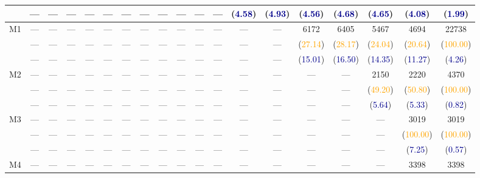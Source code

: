 {\begin{tabular}{cccccccccc|ccccccccc}
            &---&---&---&---&---&---&---&---&---&---&---&(\textcolor{darkblue}{4.58})&(\textcolor{darkblue}{4.93})&(\textcolor{darkblue}{4.56})&(\textcolor{darkblue}{4.68})&(\textcolor{darkblue}{4.65})&(\textcolor{darkblue}{4.08})&(\textcolor{darkblue}{1.99})\\\midrule
\multirow{3}{*}{M1}&          ---&          ---&          ---&          ---&          ---&          ---&          ---&          ---&          ---&          ---&          ---&          ---&          ---&        6172&        6405&        5467&        4694&       22738\\
            &---&---&---&---&---&---&---&---&---&---&---&---&---&(\textcolor{orange}{27.14})&(\textcolor{orange}{28.17})&(\textcolor{orange}{24.04})&(\textcolor{orange}{20.64})&(\textcolor{orange}{100.00})\\
            &---&---&---&---&---&---&---&---&---&---&---&---&---&(\textcolor{darkblue}{15.01})&(\textcolor{darkblue}{16.50})&(\textcolor{darkblue}{14.35})&(\textcolor{darkblue}{11.27})&(\textcolor{darkblue}{4.26})\\\midrule
\multirow{3}{*}{M2}&          ---&          ---&          ---&          ---&          ---&          ---&          ---&          ---&          ---&          ---&          ---&          ---&          ---&          ---&          ---&        2150&        2220&        4370\\
            &---&---&---&---&---&---&---&---&---&---&---&---&---&---&---&(\textcolor{orange}{49.20})&(\textcolor{orange}{50.80})&(\textcolor{orange}{100.00})\\
            &---&---&---&---&---&---&---&---&---&---&---&---&---&---&---&(\textcolor{darkblue}{5.64})&(\textcolor{darkblue}{5.33})&(\textcolor{darkblue}{0.82})\\\midrule
\multirow{3}{*}{M3}&          ---&          ---&          ---&          ---&          ---&          ---&          ---&          ---&          ---&          ---&          ---&          ---&          ---&          ---&          ---&          ---&        3019&        3019\\
            &---&---&---&---&---&---&---&---&---&---&---&---&---&---&---&---&(\textcolor{orange}{100.00})&(\textcolor{orange}{100.00})\\
            &---&---&---&---&---&---&---&---&---&---&---&---&---&---&---&---&(\textcolor{darkblue}{7.25})&(\textcolor{darkblue}{0.57})\\\midrule
\multirow{3}{*}{M4}&          ---&          ---&          ---&          ---&          ---&          ---&          ---&          ---&          ---&          ---&          ---&          ---&          ---&          ---&          ---&          ---&        3398&        3398\\

\end{tabular}}
